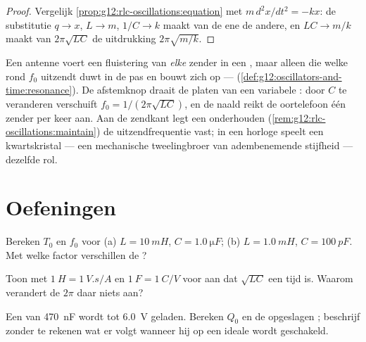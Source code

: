 \begin{proof}
Vergelijk \cref{prop:g12:rlc-oscillations:equation} met
$m\,d^2x/dt^2 = -kx$: de substitutie $q \to x$, $L \to m$, $1/C \to k$ maakt
van de ene de andere, en $LC \to m/k$ maakt van $2\pi\sqrt{LC}$ de uitdrukking
$2\pi\sqrt{m/k}$.
\end{proof}

\begin{example}\label{ex:g12:rlc-oscillations:tuning}
Een antenne voert een fluistering van \emph{elke} zender in een ,
maar alleen die welke rond $f_0$ uitzendt duwt in de pas en bouwt zich op ---
 (\cref{def:g12:oscillators-and-time:resonance}). De afstemknop
draait de platen van een variabele : door $C$ te veranderen
verschuift $f_0 = 1/(2\pi\sqrt{LC})$, en de naald reikt de oortelefoon één
zender per keer aan. Aan de zendkant legt een onderhouden 
(\cref{rem:g12:rlc-oscillations:maintain}) de uitzendfrequentie vast; in een
horloge speelt een kwartskristal --- een mechanische tweelingbroer van
adembenemende stijfheid --- dezelfde rol.
\end{example}

\section{Oefeningen}

\begin{exercise}[$\star$]\label{exo:g12:rlc-oscillations:1}
Bereken $T_0$ en $f_0$ voor (a) $L = \qty{10}{mH}$,
$C = \qty{1.0}{\micro F}$; (b) $L = \qty{1.0}{mH}$, $C = \qty{100}{pF}$. Met
welke factor verschillen de ?
\end{exercise}

\begin{exercise}[$\star$]\label{exo:g12:rlc-oscillations:2}
Toon met $\qty{1}{H} = \qty{1}{V.s/A}$ en $\qty{1}{F} = \qty{1}{C/V}$ 
voor  aan dat $\sqrt{LC}$ een tijd is. Waarom verandert de $2\pi$ daar
niets aan?
\end{exercise}

\begin{exercise}[$\star$]\label{exo:g12:rlc-oscillations:3}
Een  van \qty{470}{nF} wordt tot \qty{6.0}{V} geladen. Bereken
$Q_0$ en de opgeslagen ; beschrijf zonder te rekenen wat er volgt
wanneer hij op een ideale  wordt geschakeld.
\end{exercise}

